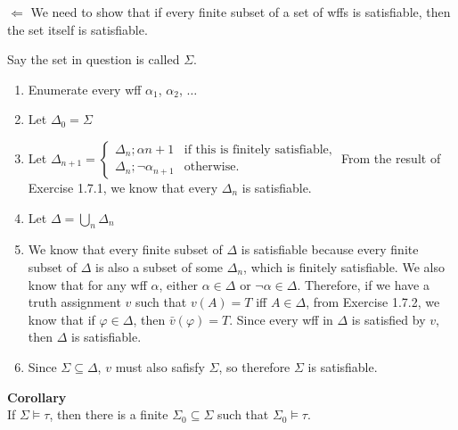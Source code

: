 \documentclass[12pt]{article}	%
\begin{document}
\begin{flushleft}
\vspace{5mm}

$\Leftarrow$ We need to show that if every finite subset of a set of wffs is satisfiable, then the set itself is satisfiable. \\

\vspace{2mm}

Say the set in question is called $\Sigma$.

\begin{enumerate}
	\item Enumerate every wff $\alpha_1$, $\alpha_2$, $\ldots$
	\item Let $\Delta_0 = \Sigma$
	\item Let 
	$
	\Delta_{n+1} = 
	\begin{cases}
	\Delta_n;\alpha{n+1}      & \text{if this is finitely satisfiable,}\\
	\Delta_n;\neg\alpha_{n+1} & \text{otherwise.}
	\end{cases}
	$
	From the result of Exercise 1.7.1, we know that every $\Delta_n$ is satisfiable.
	\item Let $\Delta = \bigcup_n\Delta_n$
	\item We know that every finite subset of $\Delta$ is satisfiable because every finite subset of $\Delta$ is also a subset of some $\Delta_n$, which is finitely satisfiable. We also know that for any wff $\alpha$, either $\alpha \in \Delta$ or $\neg\alpha \in \Delta$. Therefore, if we have a truth assignment $v$ such that $v(A) = T$ iff $A \in \Delta$, from Exercise 1.7.2, we know that if $\varphi \in \Delta$, then $\bar{v}(\varphi) = T$. Since every wff in $\Delta$ is satisfied by $v$, then $\Delta$ is satisfiable.
	\item Since $\Sigma \subseteq \Delta$, $v$ must also safisfy $\Sigma$, so therefore $\Sigma$ is satisfiable.
\end{enumerate}

\vspace{10mm}

\textbf{Corollary} \\
If $\Sigma \models \tau$, then there is a finite $\Sigma_0 \subseteq \Sigma$ such that $\Sigma_0 \models \tau$.

\vspace{10mm}


\end{flushleft}
\end{document}
